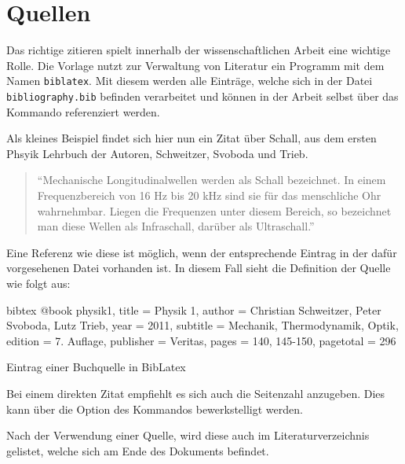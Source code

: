 \section{Quellen} 
Das richtige zitieren spielt innerhalb der wissenschaftlichen Arbeit eine wichtige Rolle. Die Vorlage nutzt zur Verwaltung von Literatur ein Programm mit dem Namen \verb|biblatex|. Mit diesem werden alle Einträge, welche sich in der Datei \verb|bibliography.bib| befinden verarbeitet und können in der Arbeit selbst über das Kommando  referenziert werden.

Als kleines Beispiel findet sich hier nun ein Zitat über Schall, aus dem ersten Phsyik Lehrbuch der Autoren, Schweitzer, Svoboda und Trieb.

\begin{quote}
\enquote{Mechanische Longitudinalwellen werden als Schall bezeichnet. In einem Frequenzbereich von 16 Hz bis 20 kHz sind sie für das menschliche Ohr wahrnehmbar. Liegen die Frequenzen unter diesem Bereich, so bezeichnet man diese Wellen als Infraschall, darüber als Ultraschall.} \cite[S. 145]{physik1}
\end{quote}

Eine Referenz wie diese ist möglich, wenn der entsprechende Eintrag in der dafür vorgesehenen Datei vorhanden ist. In diesem Fall sieht die Definition der Quelle wie folgt aus:

\begin{listing}
\begin{code}{bibtex}
@book{ physik1,
	title = {Physik 1},
	author = {Christian Schweitzer, Peter Svoboda, Lutz Trieb},
	year = {2011},
	subtitle = {Mechanik, Thermodynamik, Optik},
	edition = {7. Auflage},
	publisher = {Veritas},
	pages = {140, 145-150},
	pagetotal = {296}
}
\end{code}
\caption{Eintrag einer Buchquelle in BibLatex}
\end{listing}

Bei einem direkten Zitat empfiehlt es sich auch die Seitenzahl anzugeben. Dies kann über die Option des Kommandos  bewerkstelligt werden.
    
Nach der Verwendung einer Quelle, wird diese auch im Literaturverzeichnis gelistet, welche sich am Ende des Dokuments befindet.
